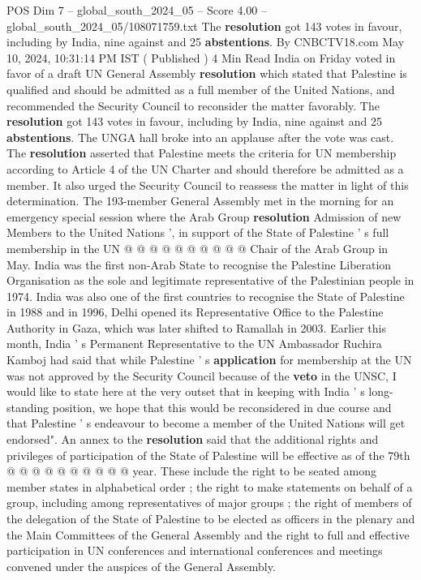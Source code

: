 \begin{textsample}{POS Dim 7 – global\_south\_2024\_05 – Score 4.00 – global\_south\_2024\_05/108071759.txt}  \label{ex:f7_pos_061}
The \textbf{resolution} got 143 votes in favour, including by India, nine against and 25 \textbf{abstentions}.
By CNBCTV18.com May 10, 2024, 10:31:14 PM IST ( Published ) 4 Min Read India on Friday voted in favor of a draft UN General Assembly \textbf{resolution} which stated that Palestine is qualified and should be admitted as a full member of the United Nations, and recommended the Security Council to reconsider the matter favorably.
The \textbf{resolution} got 143 votes in favour, including by India, nine against and 25 \textbf{abstentions}.
The UNGA hall broke into an applause after the vote was cast.
The \textbf{resolution} asserted that Palestine meets the criteria for UN membership according to Article 4 of the UN Charter and should therefore be admitted as a member.
It also urged the Security Council to reassess the matter in light of this determination.
The 193-member General Assembly met in the morning for an emergency special session where the Arab Group \textbf{resolution} Admission of new Members to the United Nations ', in support of the State of Palestine ' s full membership in the UN @ @ @ @ @ @ @ @ @ @ Chair of the Arab Group in May.
India was the first non-Arab State to recognise the Palestine Liberation Organisation as the sole and legitimate representative of the Palestinian people in 1974.
India was also one of the first countries to recognise the State of Palestine in 1988 and in 1996, Delhi opened its Representative Office to the Palestine Authority in Gaza, which was later shifted to Ramallah in 2003.
Earlier this month, India ' s Permanent Representative to the UN Ambassador Ruchira Kamboj had said that while Palestine ' s \textbf{application} for membership at the UN was not approved by the Security Council because of the \textbf{veto} in the UNSC, I would like to state here at the very outset that in keeping with India ' s long-standing position, we hope that this would be reconsidered in due course and that Palestine ' s endeavour to become a member of the United Nations will get endorsed".
An annex to the \textbf{resolution} said that the additional rights and privileges of participation of the State of Palestine will be effective as of the 79th @ @ @ @ @ @ @ @ @ @ year.
These include the right to be seated among member states in alphabetical order ; the right to make statements on behalf of a group, including among representatives of major groups ; the right of members of the delegation of the State of Palestine to be elected as officers in the plenary and the Main Committees of the General Assembly and the right to full and effective participation in UN conferences and international conferences and meetings convened under the auspices of the General Assembly.

\end{textsample}
